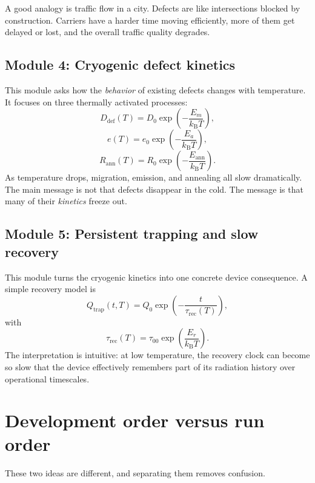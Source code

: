 \documentclass[11pt]{article}
\newcommand{\kb}{k_\mathrm{B}}
\begin{document}
A good analogy is traffic flow in a city. Defects are like intersections blocked by construction. Carriers have a harder time moving efficiently, more of them get delayed or lost, and the overall traffic quality degrades.

\subsection{Module 4: Cryogenic defect kinetics}
This module asks how the \emph{behavior} of existing defects changes with temperature. It focuses on three thermally activated processes:
\begin{equation}
D_{\mathrm{def}}(T) = D_0 \exp\!\left(-\frac{E_m}{\kb T}\right),
\end{equation}
\begin{equation}
e(T) = e_0 \exp\!\left(-\frac{E_a}{\kb T}\right),
\end{equation}
\begin{equation}
R_{\mathrm{ann}}(T) = R_0 \exp\!\left(-\frac{E_{\mathrm{ann}}}{\kb T}\right).
\end{equation}
As temperature drops, migration, emission, and annealing all slow dramatically. The main message is not that defects disappear in the cold. The message is that many of their \emph{kinetics} freeze out.

\subsection{Module 5: Persistent trapping and slow recovery}
This module turns the cryogenic kinetics into one concrete device consequence. A simple recovery model is
\begin{equation}
Q_{\mathrm{trap}}(t,T) = Q_0 \exp\!\left(-\frac{t}{\tau_{\mathrm{rec}}(T)}\right),
\end{equation}
with
\begin{equation}
\tau_{\mathrm{rec}}(T) = \tau_{00} \exp\!\left(\frac{E_r}{\kb T}\right).
\end{equation}
The interpretation is intuitive: at low temperature, the recovery clock can become so slow that the device effectively remembers part of its radiation history over operational timescales.

\section{Development order versus run order}
These two ideas are different, and separating them removes confusion.
\end{document}
